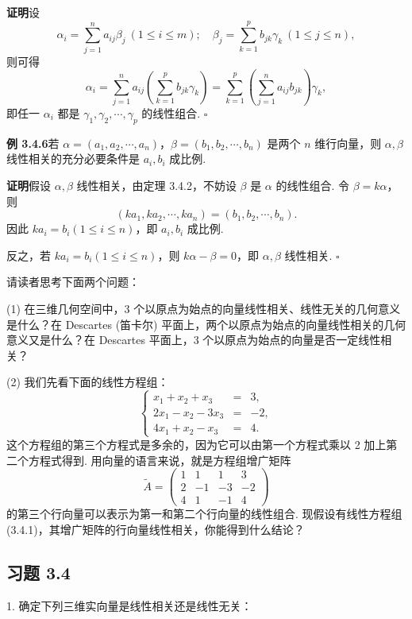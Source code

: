 \documentclass[UTF8,12pt,a4paper,fontset=fandol]{ctexart}
\begin{document}
\noindent\textbf{证明}\quad 设
\[
\alpha_i=\sum_{j=1}^{n}a_{ij}\beta_j\ (1\leq i\leq m);\quad \beta_j=\sum_{k=1}^{p}b_{jk}\gamma_k\ (1\leq j\leq n),
\]
则可得
\[
\alpha_i=\sum_{j=1}^{n}a_{ij}\left(\sum_{k=1}^{p}b_{jk}\gamma_k\right)=\sum_{k=1}^{p}\left(\sum_{j=1}^{n}a_{ij}b_{jk}\right)\gamma_k,
\]
即任一 $\alpha_i$ 都是 $\gamma_1,\gamma_2,\cdots,\gamma_p$ 的线性组合. $\square$

\noindent\textbf{例 3.4.6}\quad 若 $\alpha=(a_1,a_2,\cdots,a_n)$，$\beta=(b_1,b_2,\cdots,b_n)$ 是两个 $n$ 维行向量，则 $\alpha,\beta$ 线性相关的充分必要条件是 $a_i,b_i$ 成比例.

\noindent\textbf{证明}\quad 假设 $\alpha,\beta$ 线性相关，由定理 3.4.2，不妨设 $\beta$ 是 $\alpha$ 的线性组合. 令 $\beta=k\alpha$，则
\[
(ka_1,ka_2,\cdots,ka_n)=(b_1,b_2,\cdots,b_n).
\]
因此 $ka_i=b_i(1\leq i\leq n)$，即 $a_i,b_i$ 成比例.

反之，若 $ka_i=b_i(1\leq i\leq n)$，则 $k\alpha-\beta=0$，即 $\alpha,\beta$ 线性相关. $\square$

请读者思考下面两个问题：

(1) 在三维几何空间中，3 个以原点为始点的向量线性相关、线性无关的几何意义是什么？在 Descartes (笛卡尔) 平面上，两个以原点为始点的向量线性相关的几何意义又是什么？在 Descartes 平面上，3 个以原点为始点的向量是否一定线性相关？

(2) 我们先看下面的线性方程组：
\[
\left\{
\begin{array}{rcl}
x_1+x_2+x_3&=&3,\\
2x_1-x_2-3x_3&=&-2,\\
4x_1+x_2-x_3&=&4.
\end{array}
\right.
\]
这个方程组的第三个方程式是多余的，因为它可以由第一个方程式乘以 2 加上第二个方程式得到. 用向量的语言来说，就是方程组增广矩阵
\begin{equation}
\widetilde{A}=
\left(\begin{array}{rrrr}
1&1&1&3\\
2&-1&-3&-2\\
4&1&-1&4
\end{array}\right)
\tag{3.4.5}
\end{equation}
的第三个行向量可以表示为第一和第二个行向量的线性组合. 现假设有线性方程组 (3.4.1)，其增广矩阵的行向量线性相关，你能得到什么结论？

\subsection*{习题 3.4}

1. 确定下列三维实向量是线性相关还是线性无关：
\end{document}
